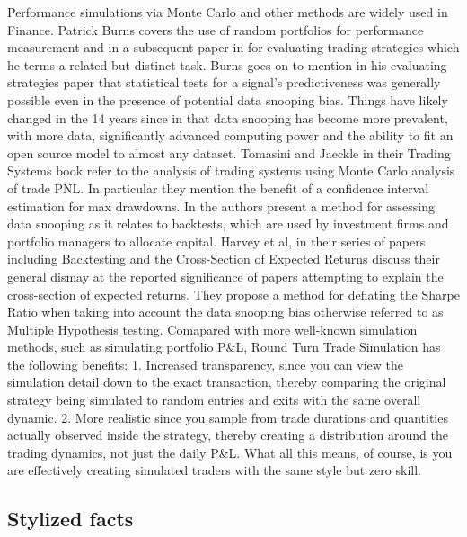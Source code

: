 Performance simulations via Monte Carlo and other methods are widely
used in Finance. Patrick Burns \citep{burns2004} covers the use of
random portfolios for performance measurement and in a subsequent paper
in \citet{burns2006} for evaluating trading strategies which he terms a
related but distinct task. Burns goes on to mention in his evaluating
strategies paper that statistical tests for a signal's predictiveness
was generally possible even in the presence of potential data snooping
bias. Things have likely changed in the 14 years since in that data
snooping has become more prevalent, with more data, significantly
advanced computing power and the ability to fit an open source model to
almost any dataset. Tomasini and Jaeckle in their Trading Systems book
\citep{tomasini2009} refer to the analysis of trading systems using
Monte Carlo analysis of trade PNL. In particular they mention the
benefit of a confidence interval estimation for max drawdowns. In
\citet{Bailey2014probability} the authors present a method for assessing
data snooping as it relates to backtests, which are used by investment
firms and portfolio managers to allocate capital. Harvey et al, in their
series of papers including Backtesting \citep{Harvey2013backtesting} and
the Cross-Section of Expected Returns \citep{Harvey2015crosssection}
discuss their general dismay at the reported significance of papers
attempting to explain the cross-section of expected returns. They
propose a method for deflating the Sharpe Ratio when taking into account
the data snooping bias otherwise referred to as Multiple Hypothesis
testing. Comapared with more well-known simulation methods, such as
simulating portfolio P\&L, Round Turn Trade Simulation has the following
benefits: 1. Increased transparency, since you can view the simulation
detail down to the exact transaction, thereby comparing the original
strategy being simulated to random entries and exits with the same
overall dynamic. 2. More realistic since you sample from trade durations
and quantities actually observed inside the strategy, thereby creating a
distribution around the trading dynamics, not just the daily P\&L. What
all this means, of course, is you are effectively creating simulated
traders with the same style but zero skill.

\hypertarget{stylized-facts}{%
\subsection{Stylized facts}\label{stylized-facts}}

